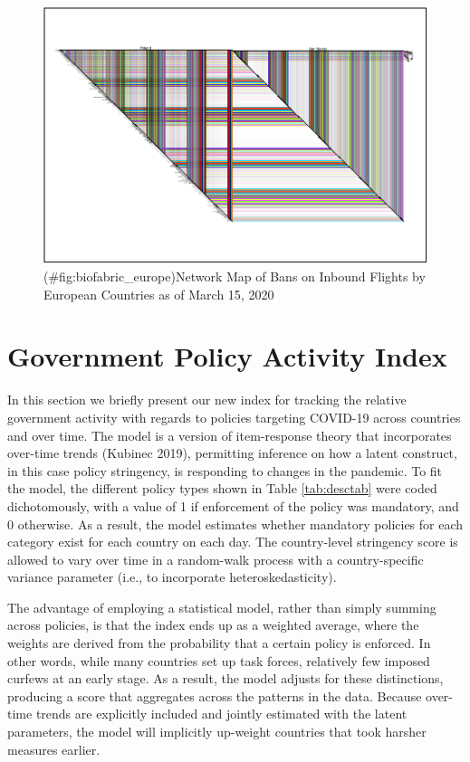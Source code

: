 \documentclass[]{article}
\begin{document}
\begin{figure}
\centering
\includegraphics{corona_wp_files/figure-latex/biofabric_europe-1.pdf}
\caption{(\#fig:biofabric\_europe)Network Map of Bans on Inbound Flights by European Countries as of March 15, 2020}
\end{figure}

\hypertarget{government-policy-activity-index}{%
\section{Government Policy Activity Index}\label{government-policy-activity-index}}

In this section we briefly present our new index for tracking the relative government activity with regards to policies targeting COVID-19 across countries and over time. The model is a version of item-response theory that incorporates over-time trends (Kubinec 2019), permitting inference on how a latent construct, in this case policy stringency, is responding to changes in the pandemic. To fit the model, the different policy types shown in Table \ref{tab:desctab} were coded dichotomously, with a value of 1 if enforcement of the policy was mandatory, and 0 otherwise. As a result, the model estimates whether mandatory policies for each category exist for each country on each day. The country-level stringency score is allowed to vary over time in a random-walk process with a country-specific variance parameter (i.e., to incorporate heteroskedasticity).

The advantage of employing a statistical model, rather than simply summing across policies, is that the index ends up as a weighted average, where the weights are derived from the probability that a certain policy is enforced. In other words, while many countries set up task forces, relatively few imposed curfews at an early stage. As a result, the model adjusts for these distinctions, producing a score that aggregates across the patterns in the data. Because over-time trends are explicitly included and jointly estimated with the latent parameters, the model will implicitly up-weight countries that took harsher measures earlier.
\end{document}
